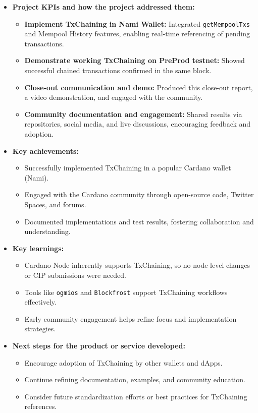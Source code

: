 \documentclass[11pt]{article}
\begin{document}
\begin{itemize}
    \item \textbf{Project KPIs and how the project addressed them:}
    \begin{itemize}
        \item \textbf{Implement TxChaining in Nami Wallet:} Integrated \texttt{getMempoolTxs} and Mempool History features, enabling real-time referencing of pending transactions.
        \item \textbf{Demonstrate working TxChaining on PreProd testnet:} Showed successful chained transactions confirmed in the same block.
        \item \textbf{Close-out communication and demo:} Produced this close-out report, a video demonstration, and engaged with the community.
        \item \textbf{Community documentation and engagement:} Shared results via repositories, social media, and live discussions, encouraging feedback and adoption.
    \end{itemize}

    \item \textbf{Key achievements:}
    \begin{itemize}
        \item Successfully implemented TxChaining in a popular Cardano wallet (Nami).
        \item Engaged with the Cardano community through open-source code, Twitter Spaces, and forums.
        \item Documented implementations and test results, fostering collaboration and understanding.
    \end{itemize}

    \item \textbf{Key learnings:}
    \begin{itemize}
        \item Cardano Node inherently supports TxChaining, so no node-level changes or CIP submissions were needed.
        \item Tools like \texttt{ogmios} and \texttt{Blockfrost} support TxChaining workflows effectively.
        \item Early community engagement helps refine focus and implementation strategies.
    \end{itemize}

    \item \textbf{Next steps for the product or service developed:}
    \begin{itemize}
        \item Encourage adoption of TxChaining by other wallets and dApps.
        \item Continue refining documentation, examples, and community education.
        \item Consider future standardization efforts or best practices for TxChaining references.
    \end{itemize}


\end{itemize}
\end{document}
